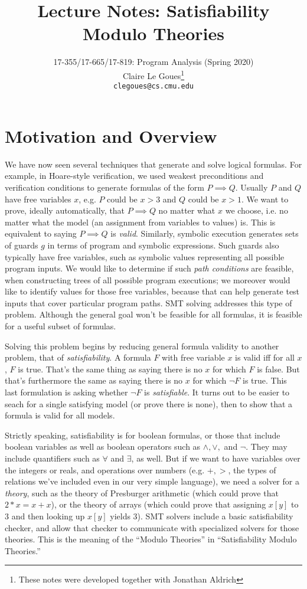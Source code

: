 \documentclass[11pt]{article}
\title{Lecture Notes: Satisfiability Modulo Theories}
\author{17-355/17-665/17-819: Program Analysis (Spring 2020)\\
        Claire Le Goues\footnote{These notes were developed together with
          Jonathan Aldrich}\\
		{\tt clegoues@cs.cmu.edu}}
\date{}
\begin{document}
\maketitle


\section{Motivation and Overview}

We have now seen several techniques that generate and solve logical formulas.
For example, in Hoare-style verification, we used weakest preconditions and
verification conditions to generate formulas of the form $P \implies Q$. Usually
$P$ and $Q$ have free variables $x$, e.g. $P$ could be $x > 3$ and $Q$ could be
$x > 1$. We want to prove, ideally automatically, that $P \implies Q$ no matter
what $x$ we choose, i.e. no matter what the model (an assignment from variables
to values) is. This is equivalent to saying $P \implies Q$ is \textit{valid}.
Similarly, symbolic execution generates sets of guards $g$ in terms of program
and symbolic expressions. Such guards also typically have free variables, such
as symbolic values representing all possible program inputs. We would like to
determine if such \emph{path conditions} are feasible, when constructing trees
of all possible program executions; we moreover would like to identify values
for those free variables, because that can help generate test inputs that cover
particular program paths. SMT solving addresses this type of problem. Although
the general goal won't be feasible for all formulas, it is feasible for a useful
subset of formulas.

Solving this problem begins by reducing general formula validity to another
problem, that of \textit{satisfiability}. A formula $F$ with free variable $x$
is valid iff for all $x$, $F$ is true. That's the same thing as saying there is
no $x$ for which $F$ is false. But that's furthermore the same as saying there
is no $x$ for which $\lnot F$ is true. This last formulation is asking whether
$\lnot F$ is \textit{satisfiable}. It turns out to be easier to seach for a
single satisfying model (or prove there is none), then to show that a formula is
valid for all models. 

Strictly speaking, satisfiability is for boolean formulas, or those that include
boolean variables as well as boolean operators such as $\land, \lor,$ and
$\lnot$. They may include quantifiers such as $\forall$ and $\exists$, as well.
But if we want to have variables over the integers or reals, and operations over
numbers (e.g. $+,>$, the types of relations we've included even in our very
simple \WhileLang language), we need a solver for a \textit{theory}, such as the
theory of Presburger arithmetic (which could prove that $2*x = x+x$), or the
theory of arrays (which could prove that assigning $x[y]$ to $3$ and then
looking up $x[y]$ yields $3$). SMT solvers include a basic satisfiability
checker, and allow that checker to communicate with specialized solvers for
those theories.  This is the meaning of the ``Modulo Theories'' in
``Satisfiability Modulo Theories.''
\end{document}
